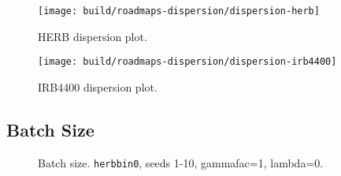 \begin{figure}
   \centering
   \texttt{[image: build/roadmaps-dispersion/dispersion-herb]}
   \caption{HERB dispersion plot.}
\end{figure}

\begin{figure}
   \centering
   \texttt{[image: build/roadmaps-dispersion/dispersion-irb4400]}
   \caption{IRB4400 dispersion plot.}
\end{figure}

\subsection{Batch Size}

\begin{figure}
   \centering
   \caption{Batch size. {\tt herbbin0}, seeds 1-10, gammafac=1, lambda=0.}
\end{figure}
